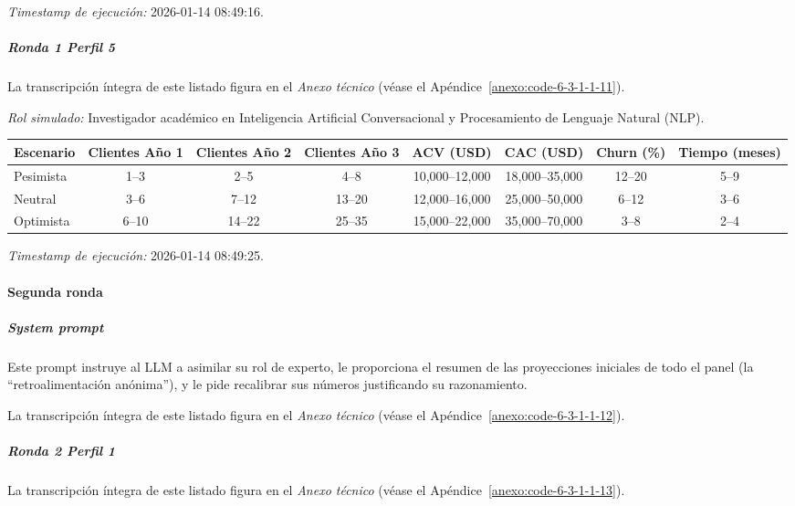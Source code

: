 \textit{Timestamp de ejecución:} 2026-01-14 08:49:16.

\subparagraph{Ronda 1 Perfil 5}

La transcripción íntegra de este listado figura en el \textit{Anexo técnico} (véase el Apéndice~\ref{anexo:code-6-3-1-1-11}).

\textit{Rol simulado:} Investigador académico en Inteligencia Artificial Conversacional y Procesamiento de Lenguaje Natural (NLP).

\begin{center}
\footnotesize
\begin{adjustbox}{max width=\textwidth}
\begin{tabular}{|l|c|c|c|c|c|c|c|}
\hline
\textbf{Escenario} & \textbf{Clientes Año 1} & \textbf{Clientes Año 2} & \textbf{Clientes Año 3} & \textbf{ACV (USD)} & \textbf{CAC (USD)} & \textbf{Churn (\%)} & \textbf{Tiempo (meses)} \\
\hline
Pesimista & 1--3 & 2--5 & 4--8 & 10,000--12,000 & 18,000--35,000 & 12--20 & 5--9 \\
\hline
Neutral & 3--6 & 7--12 & 13--20 & 12,000--16,000 & 25,000--50,000 & 6--12 & 3--6 \\
\hline
Optimista & 6--10 & 14--22 & 25--35 & 15,000--22,000 & 35,000--70,000 & 3--8 & 2--4 \\
\hline
\end{tabular}
\end{adjustbox}
\end{center}

\textit{Timestamp de ejecución:} 2026-01-14 08:49:25.

\paragraph{Segunda ronda}

\subparagraph{System prompt}

Este prompt instruye al LLM a asimilar su rol de experto, le proporciona el resumen de las proyecciones iniciales de todo el panel (la ``retroalimentación anónima''), y le pide recalibrar sus números justificando su razonamiento.

La transcripción íntegra de este listado figura en el \textit{Anexo técnico} (véase el Apéndice~\ref{anexo:code-6-3-1-1-12}).

\subparagraph{Ronda 2 Perfil 1}

La transcripción íntegra de este listado figura en el \textit{Anexo técnico} (véase el Apéndice~\ref{anexo:code-6-3-1-1-13}).

